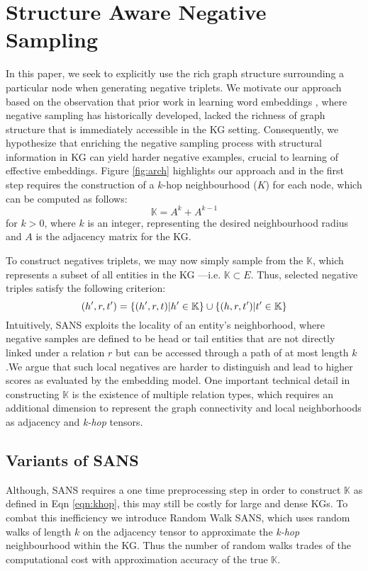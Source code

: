 \section{Structure Aware Negative Sampling}
\label{sec:proposedapproach}
In this paper, we seek to explicitly use the rich graph structure surrounding a particular node when generating negative triplets. We motivate our approach based on the observation that prior work in learning word embeddings \cite{mikolov2013distributed}, where negative sampling has historically developed, lacked the richness of graph structure that is immediately accessible in the KG setting. Consequently, we hypothesize that enriching the negative sampling process with structural information in KG can yield harder negative examples, crucial to learning of effective embeddings. Figure \ref{fig:arch} highlights our approach and in the first step requires the construction of a $k$-hop neighbourhood ($K$) for each node, which can be computed as follows: 
\begin{equation}
\label{eqn:khop}
\mathbb{K} = A^{k} + A^{k-1}
\end{equation}
for $k>0$, where $k$ is an integer, representing the desired neighbourhood radius and $A$ is the adjacency matrix for the KG.

To construct negatives triplets, we may now simply sample from the $\mathbb{K}$, which represents a subset of all entities in the KG ---i.e. $\mathbb{K} \subset E$. Thus, selected negative triples satisfy the following criterion:
\begin{equation*}
    (h',r,t') = \{ (h',r,t)|h'\in \mathbb{K}\} \cup \{(h,r,t')|t'\in \mathbb{K} \}  \\
\end{equation*}
 Intuitively, SANS exploits the locality of an entity's neighborhood, where negative samples are defined to be head or tail entities that are not directly linked under a relation $r$ but can be accessed through a path of at most length $k$.We argue that such local negatives are harder to distinguish and lead to higher scores as evaluated by the embedding model. One important technical detail in constructing $\mathbb{K}$ is the existence of multiple relation types, which requires an additional dimension to represent the graph connectivity and local neighborhoods as adjacency and \emph{k-hop} tensors.

\subsection{Variants of SANS}
Although, SANS requires a one time preprocessing step in order to construct $\mathbb{K}$ as defined in Eqn \ref{eqn:khop}, this may still be costly for large and dense KGs. To combat this inefficiency we introduce Random Walk SANS, which uses random walks of length $k$ on the adjacency tensor \cite{perozzi2014deepwalk} to approximate the \emph{k-hop} neighbourhood within the KG. Thus the number of random walks trades of the computational cost with approximation accuracy of the true $\mathbb{K}$.

